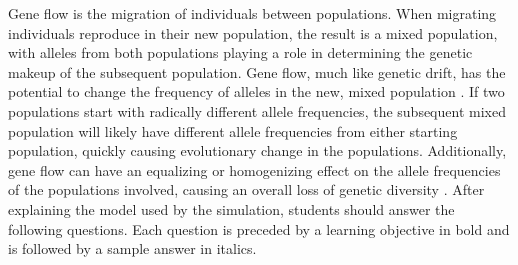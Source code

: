 \documentclass[12pt]{article}
\begin{document}
\begin{spacing}{1.5}
\newline
Gene flow is the migration of individuals between populations. When migrating individuals reproduce in their new population, the result is a mixed population, with alleles from both populations playing a role in determining the genetic makeup of the subsequent population. Gene flow, much like genetic drift, has the potential to change the frequency of alleles in the new, mixed population \cite{genAnalysis}. If two populations start with radically different allele frequencies, the subsequent mixed population will likely have different allele frequencies from either starting population, quickly causing evolutionary change in the populations. Additionally, gene flow can have an equalizing or homogenizing effect on the allele frequencies of the populations involved, causing an overall loss of genetic diversity \cite{genAnalysis}.\newline
\newline
After explaining the model used by the simulation, students should answer the following questions. Each question is preceded by a learning objective in bold and is followed by a sample answer in italics.


\end{spacing}
\end{document}

